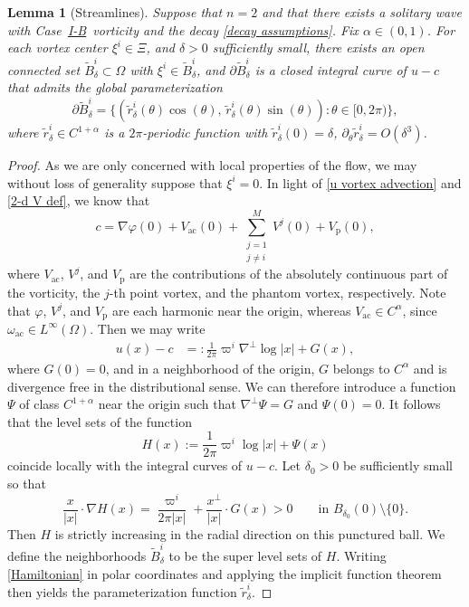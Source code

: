\documentclass[11pt,reqno]{amsart}
\newcommand{\PV}{\texorpdfstring{\hyperref[sec point]{I-B}}{I-B}}
\theoremstyle{plain}
\newtheorem{lemma}[theorem]{Lemma}
\theoremstyle{remark}
\numberwithin{equation}{section}
\begin{document}
 \begin{lemma}[Streamlines] \label{streamlines lemma} 
   Suppose that $n=2$ and that there exists a solitary wave with Case~\PV~vorticity and the decay \eqref{decay assumptions}. Fix $\alpha \in (0,1)$.  For each vortex center $\xi^i \in \Xi$, and $\delta > 0$ sufficiently small, there exists an open connected set $\tilde{B}_\delta^i \subset \Omega$ with $\xi^i \in \tilde{B}_\delta^i$, and $\partial \tilde{B}_\delta^i$ is a closed integral curve of $u-c$ that admits the global parameterization
 \begin{equation}
   \label{parameterization tilde B} \partial \tilde{B}_\delta^i = \{ (\tilde{r}_\delta^i(\theta) \cos(\theta), \, \tilde r_\delta^i(\theta) \sin(\theta)) : \theta \in [0,2\pi) \},
 \end{equation}
 where $\tilde r_\delta^i \in C^{1+\alpha}$ is a $2\pi$-periodic function with $\tilde r_\delta^i(0) = \delta$, $\partial_\theta \tilde r_\delta^i = O(\delta^3)$.
  \end{lemma}
 \begin{proof}
As we are only concerned with local properties of the flow, we may without loss of generality suppose that $\xi^i = 0$.  
In light of \eqref{u vortex advection} and \eqref{2-d V def}, we know that
\[ c = \nabla \varphi(0) + V_{\mathrm{ac}}(0) + \sum_{\substack{j = 1 \\ j \neq i}}^M V^j(0) + V_{\mathrm{p}}(0),\]
where $V_{\mathrm{ac}}$, $V^j$, and $V_{\mathrm{p}}$ are the contributions of the absolutely continuous part of the vorticity, the $j$-th point vortex, and the phantom vortex, respectively.  Note that $\varphi$, $V^j$, and $V_{\mathrm{p}}$ are each harmonic near the origin, whereas $V_{\mathrm{ac}} \in C^{\alpha}$, since $\omega_{\mathrm{ac}} \in L^\infty(\Omega)$. Then we may write
\begin{align}\label{velocity near vortex} u(x) - c &=:  \frac{1}{2\pi} \varpi^i \nabla^\perp \log{|x|} + G(x), \end{align}
where $G(0) = 0$, and in a neighborhood of the origin, $G$ belongs to $C^\alpha$ and is divergence free in the distributional sense.       
We can therefore introduce a function $\Psi$ of class $C^{1+\alpha}$ near the origin such that $\nabla^\perp \Psi = G$ and $\Psi(0) = 0$.  It follows that the level sets of the function
\begin{equation}\label{Hamiltonian} H(x) := \frac{1}{2\pi} \varpi^i \log{|x|} + \Psi(x)\end{equation}
coincide locally with the integral curves of $u - c$.  Let  $\delta_0 > 0$ be sufficiently small so that 
\[ \frac{x}{|x|} \cdot \nabla H(x) = \frac{\varpi^i}{2\pi |x|} + \frac{x^\perp}{|x|} \cdot G(x) > 0  \qquad \textrm{in } B_{\delta_0}(0) \setminus \{0\}.\]
Then $H$ is strictly increasing in the radial direction on this punctured ball.  We define the neighborhoods $\tilde B_\delta^i$ to be the super level sets of $H$.  Writing \eqref{Hamiltonian} in polar coordinates and applying the implicit function theorem then yields the parameterization function $\tilde r_\delta^i$.  \end{proof}
 
\end{document}
